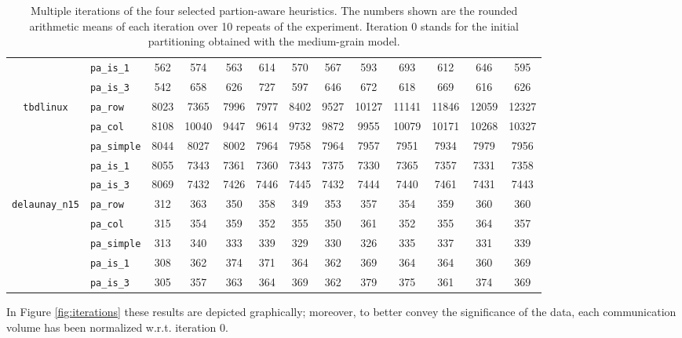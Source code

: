 \begin{table}
\begin{tabular}{|c|l|c||c|c|c|c|c|c|c|c|c|c|}
		&\verb|pa_is_1| & 562 & 574 & 563 & 614 & 570 & 567 & 593 & 693 & 612 & 646 & 595 \\
		&\verb|pa_is_3| &542 & 658 & 626 & 727 & 597 & 646 & 672 & 618 & 669 & 616 & 626 \\ \hline
		\multirow{5}{*}{\texttt{tbdlinux}}		&\verb|pa_row| & 8023 & 7365  & 7996  & 7977  & 8402  & 9527 & 10127 & 11141 & 11846 & 12059 & 12327 \\ 
		&\verb|pa_col| & 8108 & 10040  & 9447  & 9614  & 9732  & 9872  & 9955 & 10079 & 10171 & 10268 & 10327 \\ 
		&\verb|pa_simple| & 8044 & 8027 & 8002 & 7964 & 7958 & 7964 & 7957 & 7951 & 7934 & 7979 & 7956 \\
		&\verb|pa_is_1| & 8055 & 7343 & 7361 & 7360 & 7343 & 7375 & 7330 & 7365 & 7357 & 7331 & 7358 \\
		&\verb|pa_is_3| & 8069 & 7432 & 7426 & 7446 & 7445 & 7432 & 7444 & 7440 & 7461 & 7431 & 7443 \\ \hline
		\multirow{5}{*}{\texttt{delaunay\_n15}}		&\verb|pa_row| & 312 & 363 &  350 &  358 &  349 &  353 &  357 &  354  & 359 &  360 &  360 \\ 
		&\verb|pa_col| & 315 & 354 & 359 & 352 & 355 & 350 & 361 & 352 & 355 & 364 & 357 \\ 
		&\verb|pa_simple| & 313 & 340 & 333 & 339 & 329 & 330 & 326 & 335 & 337 & 331 & 339 \\
		&\verb|pa_is_1| & 308 & 362 & 374 & 371 & 364 & 362 & 369 & 364 & 364 & 360 & 369 \\
		&\verb|pa_is_3| & 305 & 357 & 363 & 364 & 369 & 362 & 379 & 375 & 361 & 374 & 369 \\\hline
		\end{tabular}
	\caption{Multiple iterations of the four selected partion-aware heuristics. The numbers shown are the rounded arithmetic means of each iteration over 10 repeats of the experiment. Iteration 0 stands for the initial partitioning obtained with the medium-grain model.} \label{tab:iterations}
\end{table}

In Figure \ref{fig:iterations} these results are depicted graphically; moreover, to better convey the significance of the data, each communication volume has been normalized w.r.t. iteration 0.

